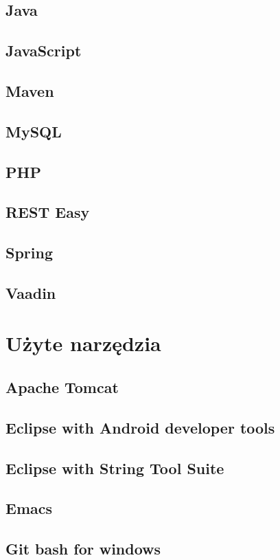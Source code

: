 \documentclass[11pt,a4paper,polish,thesis]{dcsbook}
\begin{document}
\subsection{Java}
\subsection{JavaScript}
\subsection{Maven}
\subsection{MySQL}
\subsection{PHP}
\subsection{REST Easy}
\subsection{Spring}
\subsection{Vaadin}

\section{Użyte narzędzia}
\subsection{Apache Tomcat}
\subsection{Eclipse with Android developer tools}
\subsection{Eclipse with String Tool Suite}
\subsection{Emacs}
\subsection{Git bash for windows}
\end{document}
